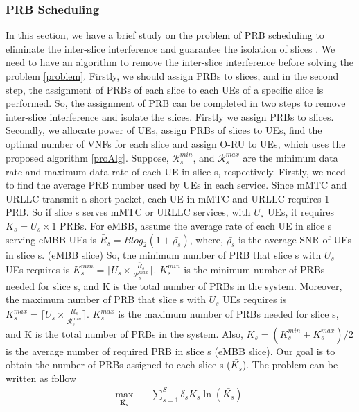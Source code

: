 \documentclass[lettersize,journal]{IEEEtran}
\begin{document}
\subsubsection{PRB Scheduling}\label{prb}
\textcolor{Sepia}{ In this section, we have a brief study on the problem of PRB scheduling to eliminate  the inter-slice interference and guarantee the isolation of slices \cite{marabissi2019highly}.
We need to have an algorithm to remove the inter-slice interference before solving the problem \ref{problem}. Firstly, we should assign PRBs to slices, and in the second step, the assignment of PRBs of each slice to each UEs of a specific slice is performed. So, the assignment of PRB can be completed in two steps to remove inter-slice interference and isolate the slices. Firstly we assign PRBs to slices. Secondly, we allocate power of UEs, assign PRBs of slices to UEs, find the optimal number of VNFs for each slice and assign O-RU to UEs, which uses the proposed algorithm \ref{proAlg}.
Suppose, $\mathcal{R}_{{s}}^{min}$, and $\mathcal{R}_{{s}}^{max}$ are the minimum data rate and maximum data rate of each UE in slice s, respectively.
Firstly, we need to find the average PRB number used by UEs in each service. Since mMTC and URLLC transmit a short packet, each UE in mMTC and URLLC requires 1 PRB. So if slice s serves mMTC or URLLC services, with $U_s$ UEs, it requires $K_s = U_s \times 1$ PRBs. For eMBB, assume the average rate of each UE in slice s serving eMBB UEs is $\bar{R}_s = Blog_2(1 + \bar{\rho_s})$, where, $\bar{\rho_s}$ is the average SNR of UEs in slice s. (eMBB slice)
So, the minimum number of PRB that slice s with $U_s$ UEs requires is $K_s^{min} = \lceil{U_s \times \frac{\bar{R}_s}{\mathcal{R}_{{s}}^{max}}}\rceil$. $K_s^{min} $ is the minimum number of PRBs needed for slice s, and K is the total number of PRBs in the system.  
Moreover, the maximum number of PRB that slice s with $U_s$ UEs requires is $K_s^{max} = \lceil{U_s \times \frac{\bar{R}_s}{\mathcal{R}_{{s}}^{min}}}\rceil$. $K_s^{max} $ is the maximum number of PRBs needed for slice s, and K is the total number of PRBs in the system. Also, $K_s = (K_s^{min}+K_s^{max})/2$ is the average number of required PRB in slice s (eMBB slice).
Our goal is to obtain the number of PRBs assigned to each slice s ($\bar{K_s}$).
The problem can be written as follow
\begin{subequations}\label{prob:prb}
\begin{alignat}{4}
\max\limits_{\boldsymbol{\bar{K_s}}} \quad &  \sum_{s=1}^{S}\delta_s K_s \ln(\bar{K_s}) \ \\

\end{alignat}
\end{subequations}}
\end{document}
